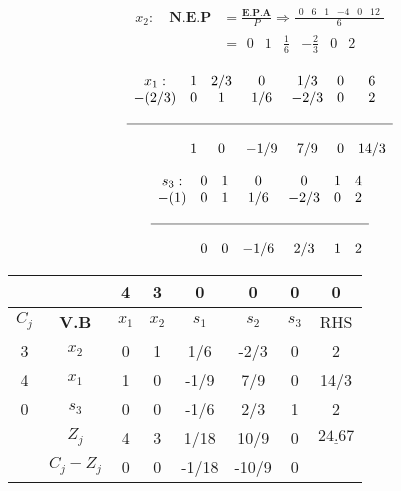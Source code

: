 \documentclass{templateNote}
\begin{document}
\begin{enumerate}
    \newpage
    \begin{align*}
        x_2: \quad \textbf{N.E.P} &= \frac{\textbf{E.P.A}}{P} \Rightarrow \frac{\begin{array}{cccccc} 0 & 6 & 1 & -4 & 0 & 12 \end{array}}{6} \\
        &= \begin{array}{cccccc} 0 & 1 & \frac{1}{6} & -\frac{2}{3} & 0 & 2 \end{array}
    \end{align*}

    \begin{equation*}
        \begin{array}{ccccccc}
            x_1: & 1 & 2/3 & 0 & 1/3 & 0 & 6 \\
            -(2/3) & 0 & 1 & 1/6 & -2/3 & 0 & 2\\
            \\ \hline \\
            & 1 & 0 & -1/9 & 7/9 & 0 & 14/3
        \end{array}
    \end{equation*}
    
    \begin{equation*}
        \begin{array}{ccccccc}
            s_3: & 0 & 1 & 0 & 0 & 1 & 4 \\
            -(1) & 0 & 1 & 1/6 & -2/3 & 0 & 2\\
            \\ \hline \\
            & 0 & 0 & -1/6 & 2/3 & 1 & 2
        \end{array}
    \end{equation*}
    
    \begin{center}
        \begin{tabular}{|c|c|c|c|c|c|c|c|}
            \hline
            & & 4 & 3 & 0 & 0 & 0 & 0 \\ \hline
            $C_j$ & \textbf{V.B} & $x_1$ & $x_2$ & $s_1$ & $s_2$ & $s_3$ & RHS \\ \hline
            3 & $x_2$ & 0 & 1 & 1/6 & -2/3 & 0 & \cellcolor{Celeste!50}2 \\
            4 & $x_1$ & 1 & 0 & -1/9 & 7/9 & 0 & \cellcolor{Morado!50}14/3 \\
            0 & $s_3$ & 0 & 0 & -1/6 & 2/3 & 1 & \cellcolor{green!50}2 \\ \hline
            & $Z_j$ & 4 & 3 & \cellcolor{yellow}1/18 & \cellcolor{yellow}10/9 & \cellcolor{yellow}0 & \cellcolor{Salmon!50}$\underline{24.67}$ \\ \hline
            & $C_j - Z_j$ & 0 & 0 & -1/18 & -10/9 & 0 & \\ \hline
        \end{tabular}
    \end{center}


\end{enumerate}
\end{document}
